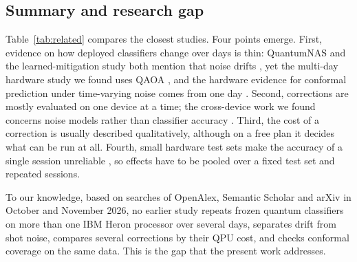\subsection{Summary and research gap}
\label{sec:gap}
Table~\ref{tab:related} compares the closest studies. Four points emerge. First, evidence on how
deployed classifiers change over days is thin: QuantumNAS and the learned-mitigation study both
mention that noise drifts \cite{wang2022quantumnas,liao2024mlqem}, yet the multi-day hardware
study we found uses QAOA \cite{qaoa2026drift}, and the hardware evidence for conformal
prediction under time-varying noise comes from one day \cite{spencer2026aqcp}. Second,
corrections are mostly evaluated on one device at a time; the cross-device work we found
concerns noise models rather than classifier accuracy \cite{farib2026crossdevice}. Third, the
cost of a correction is usually described qualitatively, although on a free plan it decides what
can be run at all. Fourth, small hardware test sets make the accuracy of a single session
unreliable \cite{qbiobench2026}, so effects have to be pooled over a fixed test set and
repeated sessions.

To our knowledge, based on searches of OpenAlex, Semantic Scholar and arXiv in October and
November 2026, no earlier study repeats frozen quantum classifiers on more than one IBM Heron
processor over several days, separates drift from shot noise, compares several corrections by
their QPU cost, and checks conformal coverage on the same data. This is the gap that the
present work addresses.
